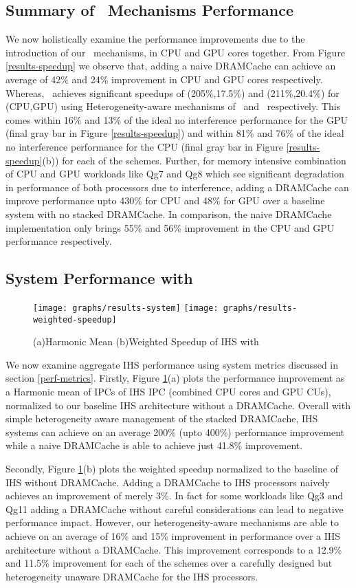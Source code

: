 \subsection{Summary of \cachename\ Mechanisms Performance}
We now holistically examine the performance improvements due to the introduction of our \cachename\ mechanisms, in  CPU and GPU cores together. From Figure \ref{results-speedup} we observe that, adding a naive DRAMCache can achieve an average of 42\% and 24\% improvement in CPU and GPU cores respectively. Whereas, \cachename\ achieves significant speedups of (205\%,17.5\%) and (211\%,20.4\%) for (CPU,GPU) using Heterogeneity-aware mechanisms of \bypassname\ and \chaining\ respectively. This comes within 16\% and 13\% of the ideal no interference performance for the GPU (final gray bar in Figure \ref{results-speedup}) and within 81\% and 76\% of the ideal no interference performance for the CPU (final gray bar in Figure \ref{results-speedup}(b)) for each of the schemes. Further, for memory intensive combination of CPU and GPU workloads like Qg7 and Qg8 which see significant degradation in performance of both processors due to interference, adding a DRAMCache can improve performance upto 430\% for CPU and 48\% for GPU over a baseline system with no stacked DRAMCache. In comparison, the naive DRAMCache implementation only brings 55\% and 56\% improvement in the CPU and GPU performance respectively.

\subsection{System Performance with \cachename}
\begin{figure}[!htb]
	\centering
	\texttt{[image: graphs/results-system]}
	\texttt{[image: graphs/results-weighted-speedup]}
	\caption{(a)Harmonic Mean (b)Weighted Speedup of IHS with \cachename}
	\label{results-system}
\end{figure}
\par We now examine aggregate IHS performance using system metrics discussed in section \ref{perf-metrics}. Firstly, Figure \ref{results-system}(a) plots the performance improvement as a Harmonic mean of IPCs of IHS IPC (combined CPU cores and GPU CUs), normalized to our baseline IHS architecture without a DRAMCache. Overall with simple heterogeneity aware management of the stacked DRAMCache, IHS systems can achieve on an average 200\% (upto 400\%) performance improvement while a naive DRAMCache is able to achieve just 41.8\% improvement.
\par Secondly, Figure \ref{results-system}(b) plots the weighted speedup normalized to the baseline of IHS without DRAMCache. Adding a DRAMCache to IHS processors naively achieves an improvement of merely 3\%. In fact for some workloads like Qg3 and Qg11 adding a DRAMCache without careful considerations can lead to negative performance impact. However, our heterogeneity-aware mechanisms are able to achieve on an average of 16\% and 15\%  improvement in performance over a IHS architecture without a DRAMCache. This improvement corresponds to a 12.9\% and 11.5\% improvement for each of the schemes over a carefully designed but heterogeneity unaware DRAMCache for the IHS processors.


